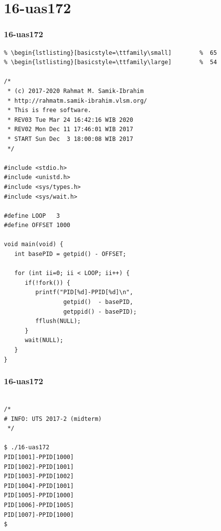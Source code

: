 \documentclass[aspectratio=169, xcolor=table, notheorems, hyperref={pdfpagelabels=false}]{beamer}
\begin{document}
\section{16-uas172}
\begin{frame}[fragile]
\frametitle{16-uas172}
\begin{lstlisting}[basicstyle=\ttfamily\tiny]         % 108
% \begin{lstlisting}[basicstyle=\ttfamily\footnotesize] %  72
% \begin{lstlisting}[basicstyle=\ttfamily\small]        %  65
% \begin{lstlisting}[basicstyle=\ttfamily\large]        %  54

/*
 * (c) 2017-2020 Rahmat M. Samik-Ibrahim
 * http://rahmatm.samik-ibrahim.vlsm.org/
 * This is free software.
 * REV03 Tue Mar 24 16:42:16 WIB 2020
 * REV02 Mon Dec 11 17:46:01 WIB 2017
 * START Sun Dec  3 18:00:08 WIB 2017
 */

#include <stdio.h>
#include <unistd.h>
#include <sys/types.h>
#include <sys/wait.h>

#define LOOP   3
#define OFFSET 1000

void main(void) {
   int basePID = getpid() - OFFSET;

   for (int ii=0; ii < LOOP; ii++) {
      if(!fork()) {
         printf("PID[%d]-PPID[%d]\n", 
                 getpid()  - basePID, 
                 getppid() - basePID);
         fflush(NULL);
      }
      wait(NULL);
   }
}

\end{lstlisting}
\end{frame}

\begin{frame}[fragile]
\frametitle{16-uas172}
\begin{lstlisting}[basicstyle=\ttfamily\large]        %  54

/*
# INFO: UTS 2017-2 (midterm)
 */

$ ./16-uas172 
PID[1001]-PPID[1000]
PID[1002]-PPID[1001]
PID[1003]-PPID[1002]
PID[1004]-PPID[1001]
PID[1005]-PPID[1000]
PID[1006]-PPID[1005]
PID[1007]-PPID[1000]
$ 

\end{lstlisting}
\end{frame}
\end{document}
